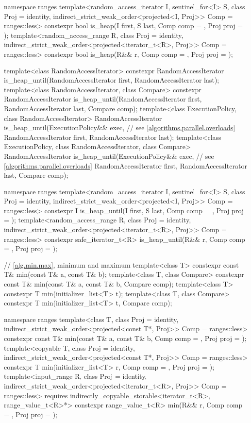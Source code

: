 \begin{codeblock}
{  namespace ranges {
    template<random_access_iterator I, sentinel_for<I> S, class Proj = identity,
             indirect_strict_weak_order<projected<I, Proj>> Comp = ranges::less>
      constexpr bool is_heap(I first, S last, Comp comp = {}, Proj proj = {});
    template<random_access_range R, class Proj = identity,
             indirect_strict_weak_order<projected<iterator_t<R>, Proj>> Comp = ranges::less>
      constexpr bool is_heap(R&& r, Comp comp = {}, Proj proj = {});
  }

  template<class RandomAccessIterator>
    constexpr RandomAccessIterator
      is_heap_until(RandomAccessIterator first, RandomAccessIterator last);
  template<class RandomAccessIterator, class Compare>
    constexpr RandomAccessIterator
      is_heap_until(RandomAccessIterator first, RandomAccessIterator last,
                    Compare comp);
  template<class ExecutionPolicy, class RandomAccessIterator>
    RandomAccessIterator
      is_heap_until(ExecutionPolicy&& exec,                     // see \ref{algorithms.parallel.overloads}
                    RandomAccessIterator first, RandomAccessIterator last);
  template<class ExecutionPolicy, class RandomAccessIterator, class Compare>
    RandomAccessIterator
      is_heap_until(ExecutionPolicy&& exec,                     // see \ref{algorithms.parallel.overloads}
                    RandomAccessIterator first, RandomAccessIterator last,
                    Compare comp);

  namespace ranges {
    template<random_access_iterator I, sentinel_for<I> S, class Proj = identity,
             indirect_strict_weak_order<projected<I, Proj>> Comp = ranges::less>
      constexpr I is_heap_until(I first, S last, Comp comp = {}, Proj proj = {});
    template<random_access_range R, class Proj = identity,
             indirect_strict_weak_order<projected<iterator_t<R>, Proj>> Comp = ranges::less>
      constexpr safe_iterator_t<R>
        is_heap_until(R&& r, Comp comp = {}, Proj proj = {});
  }

  // \ref{alg.min.max}, minimum and maximum
  template<class T> constexpr const T& min(const T& a, const T& b);
  template<class T, class Compare>
    constexpr const T& min(const T& a, const T& b, Compare comp);
  template<class T>
    constexpr T min(initializer_list<T> t);
  template<class T, class Compare>
    constexpr T min(initializer_list<T> t, Compare comp);

  namespace ranges {
    template<class T, class Proj = identity,
             indirect_strict_weak_order<projected<const T*, Proj>> Comp = ranges::less>
      constexpr const T& min(const T& a, const T& b, Comp comp = {}, Proj proj = {});
    template<copyable T, class Proj = identity,
             indirect_strict_weak_order<projected<const T*, Proj>> Comp = ranges::less>
      constexpr T min(initializer_list<T> r, Comp comp = {}, Proj proj = {});
    template<input_range R, class Proj = identity,
             indirect_strict_weak_order<projected<iterator_t<R>, Proj>> Comp = ranges::less>
      requires indirectly_copyable_storable<iterator_t<R>, range_value_t<R>*>
      constexpr range_value_t<R>
        min(R&& r, Comp comp = {}, Proj proj = {});
  }

}
\end{codeblock}
